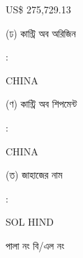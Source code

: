 \documentclass[12pt]{article}
\newcommand{\price}{US\$ 275,729.13}
\newcommand{\co}{CHINA}
\newcommand{\coship}{CHINA}
\newcommand{\vessel}{SOL HIND}
\begin{document}
\begin{minipage}[t]{0.53\linewidth}
{\price}
\\
\end{minipage}
\begin{minipage}[t]{0.05\linewidth}
\hspace*{1em}
\end{minipage}
\begin{minipage}[t]{0.40\linewidth}
(ঢ) কান্ট্রি অব অরিজিন
\end{minipage}
\begin{minipage}[t]{0.02\linewidth}
:
\end{minipage}
\begin{minipage}[t]{0.53\linewidth}
{\co}
\\
\end{minipage}
\begin{minipage}[t]{0.05\linewidth}
\hspace*{1em}
\end{minipage}
\begin{minipage}[t]{0.40\linewidth}
(ণ) কান্ট্রি অব শিপমেন্ট
\end{minipage}
\begin{minipage}[t]{0.02\linewidth}
:
\end{minipage}
\begin{minipage}[t]{0.53\linewidth}
{\coship}
\\
\end{minipage}
\begin{minipage}[t]{0.05\linewidth}
\hspace*{1em}
\end{minipage}
\begin{minipage}[t]{0.40\linewidth}
(ত) জাহাজের নাম
\end{minipage}
\begin{minipage}[t]{0.02\linewidth}
:
\end{minipage}
\begin{minipage}[t]{0.53\linewidth}
{\vessel}
\end{minipage}
\begin{minipage}[t]{0.05\linewidth}
\hspace*{1em}
\end{minipage}
\begin{minipage}[t]{0.40\linewidth}
\hspace*{1.8em}পালা নং বি/এল নং
\end{minipage}
\begin{minipage}[t]{0.02\linewidth}
\hspace{1em}
\end{minipage}
\end{document}
